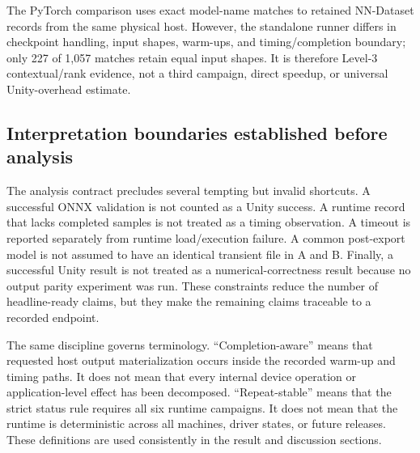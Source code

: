 The PyTorch comparison uses exact model-name matches to retained NN-Dataset records from the same physical host. However, the standalone runner differs in checkpoint handling, input shapes, warm-ups, and timing/completion boundary; only 227 of 1,057 matches retain equal input shapes. It is therefore Level-3 contextual/rank evidence, not a third campaign, direct speedup, or universal Unity-overhead estimate.

\subsection{Interpretation boundaries established before analysis}
The analysis contract precludes several tempting but invalid shortcuts. A successful ONNX validation is not counted as a Unity success. A runtime record that lacks completed samples is not treated as a timing observation. A timeout is reported separately from runtime load/execution failure. A common post-export model is not assumed to have an identical transient file in A and B. Finally, a successful Unity result is not treated as a numerical-correctness result because no output parity experiment was run. These constraints reduce the number of headline-ready claims, but they make the remaining claims traceable to a recorded endpoint.

The same discipline governs terminology. ``Completion-aware'' means that requested host output materialization occurs inside the recorded warm-up and timing paths. It does not mean that every internal device operation or application-level effect has been decomposed. ``Repeat-stable'' means that the strict status rule requires all six runtime campaigns. It does not mean that the runtime is deterministic across all machines, driver states, or future releases. These definitions are used consistently in the result and discussion sections.
